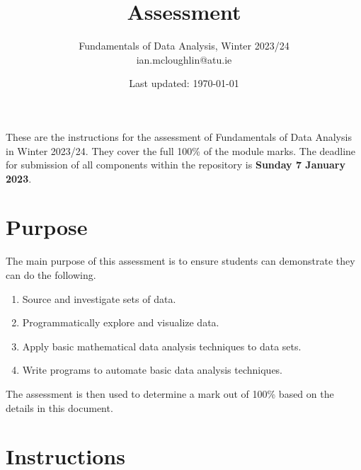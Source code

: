 \documentclass{iansnotes}
\title{Assessment}
\author{Fundamentals of Data Analysis, Winter 2023/24\\ian.mcloughlin@atu.ie}
\date{Last updated: \today}
\begin{document}
 
\maketitle

These are the instructions for the assessment of Fundamentals of Data Analysis in Winter 2023/24.
They cover the full 100\% of the module marks.
The deadline for submission of all components within the repository is \textbf{Sunday 7 January 2023}.

\section{Purpose}
The main purpose of this assessment is to ensure students can demonstrate they can do the following.
\begin{enumerate}
  \item Source and investigate sets of data.
  \item Programmatically explore and visualize data.
  \item Apply basic mathematical data analysis techniques to data sets.
  \item Write programs to automate basic data analysis techniques.
\end{enumerate}
The assessment is then used to determine a mark out of 100\% based on the details in this document.


\section{Instructions}
\end{document}
